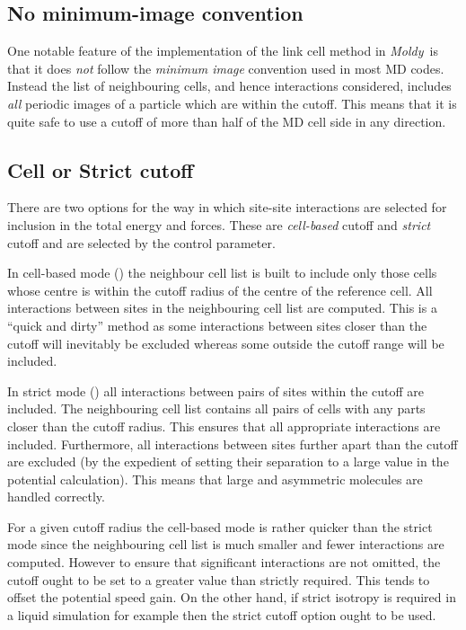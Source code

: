 \documentclass[a4paper,twoside]{report}
\newcommand{\moldy}{\emph{Moldy}}
\begin{document}
\subsection{No minimum-image convention}
One notable feature of the implementation of the link cell method in
\moldy\ is that it does \emph{not} follow the \emph{minimum image}
convention used in most MD codes.  Instead the list of neighbouring
cells, and hence interactions considered, includes \emph{all} periodic
images of a particle which are within the cutoff.  This means that it
is quite safe to use a cutoff of more than half of the MD cell side in
any direction.  

\subsection{Cell or Strict cutoff}
\label{sec:strict-cutoff}
There are two options for the way in which site-site interactions are
selected for inclusion in the total energy and forces.  These are
\emph{cell-based} cutoff and \emph{strict} cutoff and are selected
by the  control parameter.

In cell-based mode () the neighbour cell list is
built to include only those cells whose centre is within the cutoff
radius of the centre of the reference cell.  All interactions between
sites in the neighbouring cell list are computed.  This is a ``quick
and dirty'' method as some interactions between sites closer than the
cutoff will inevitably be excluded whereas some outside the cutoff
range will be included.

In strict mode () all interactions between pairs
of sites within the cutoff are included.  The neighbouring cell list
contains all pairs of cells with any parts closer than the cutoff
radius.  This ensures that all appropriate interactions are included.
Furthermore, all interactions between sites further apart than the
cutoff are excluded (by the expedient of setting their separation to a
large value in the potential calculation).  This means that large and
asymmetric molecules are handled correctly.

For a given cutoff radius the cell-based mode is rather quicker than
the strict mode since the neighbouring cell list is much smaller and
fewer interactions are computed.  However to ensure that significant
interactions are not omitted, the cutoff ought to be set to a
greater value than strictly required.    This tends to offset the
potential speed gain.   On the other hand, if strict isotropy is
required in a liquid simulation for example then the strict cutoff
option ought to be used.
\end{document}
